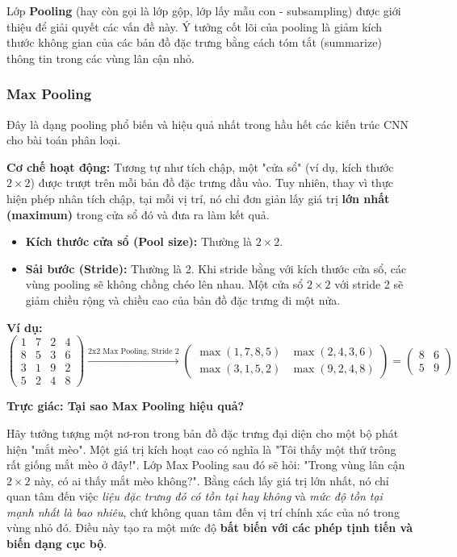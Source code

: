 Lớp \textbf{Pooling} (hay còn gọi là lớp gộp, lớp lấy mẫu con - subsampling) được giới thiệu để giải quyết các vấn đề này. Ý tưởng cốt lõi của pooling là giảm kích thước không gian của các bản đồ đặc trưng bằng cách tóm tắt (summarize) thông tin trong các vùng lân cận nhỏ.

\subsubsection{Max Pooling}
\label{subsubsec:max_pooling}
Đây là dạng pooling phổ biến và hiệu quả nhất trong hầu hết các kiến trúc CNN cho bài toán phân loại.

\textbf{Cơ chế hoạt động:} Tương tự như tích chập, một "cửa sổ" (ví dụ, kích thước $2 \times 2$) được trượt trên mỗi bản đồ đặc trưng đầu vào. Tuy nhiên, thay vì thực hiện phép nhân tích chập, tại mỗi vị trí, nó chỉ đơn giản lấy giá trị \textbf{lớn nhất (maximum)} trong cửa sổ đó và đưa ra làm kết quả.
\begin{itemize}
	\item \textbf{Kích thước cửa sổ (Pool size):} Thường là $2 \times 2$.
	\item \textbf{Sải bước (Stride):} Thường là 2. Khi stride bằng với kích thước cửa sổ, các vùng pooling sẽ không chồng chéo lên nhau. Một cửa sổ $2 \times 2$ với stride 2 sẽ giảm chiều rộng và chiều cao của bản đồ đặc trưng đi một nửa.
\end{itemize}
\textbf{Ví dụ:}
\[
\begin{pmatrix}
	1 & 7 & 2 & 4 \\
	8 & 5 & 3 & 6 \\
	3 & 1 & 9 & 2 \\
	5 & 2 & 4 & 8
\end{pmatrix}
\xrightarrow{\text{2x2 Max Pooling, Stride 2}}
\begin{pmatrix}
	\max(1,7,8,5) & \max(2,4,3,6) \\
	\max(3,1,5,2) & \max(9,2,4,8)
\end{pmatrix}
=
\begin{pmatrix}
	8 & 6 \\
	5 & 9
\end{pmatrix}
\]


\begin{mdframed}[style=infobox]
	\textbf{Trực giác: Tại sao Max Pooling hiệu quả?}
	
	Hãy tưởng tượng một nơ-ron trong bản đồ đặc trưng đại diện cho một bộ phát hiện "mắt mèo". Một giá trị kích hoạt cao có nghĩa là "Tôi thấy một thứ trông rất giống mắt mèo ở đây!". Lớp Max Pooling sau đó sẽ hỏi: "Trong vùng lân cận $2 \times 2$ này, có ai thấy mắt mèo không?". Bằng cách lấy giá trị lớn nhất, nó chỉ quan tâm đến việc \textit{liệu đặc trưng đó có tồn tại hay không} và \textit{mức độ tồn tại mạnh nhất là bao nhiêu}, chứ không quan tâm đến vị trí chính xác của nó trong vùng nhỏ đó. Điều này tạo ra một mức độ \textbf{bất biến với các phép tịnh tiến và biến dạng cục bộ}.
\end{mdframed}

